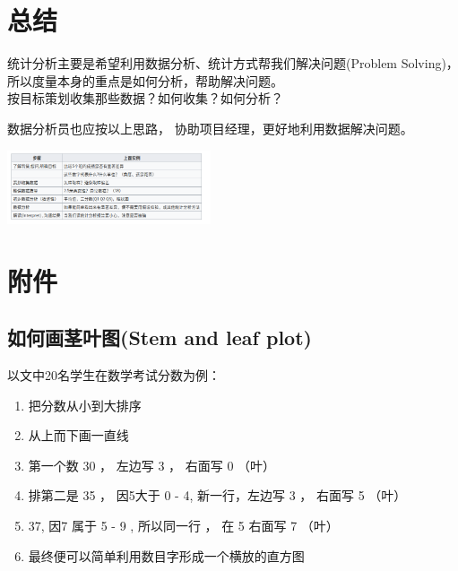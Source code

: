 \begin{description}
\item[]
\end{description}

\hypertarget{ux603bux7ed3}{%
\section{总结}\label{ux603bux7ed3}}

统计分析主要是希望利用数据分析、统计方式帮我们解决问题(Problem
Solving)，所以度量本身的重点是如何分析，帮助解决问题。\\
按目标策划收集那些数据？如何收集？如何分析？

数据分析员也应按以上思路， 协助项目经理，更好地利用数据解决问题。

\includegraphics[width=6cm]{Screenshotfrom2023-01-0222-21-59.png}

\hypertarget{ux9644ux4ef6}{%
\section{附件}\label{ux9644ux4ef6}}

\hypertarget{ux5982ux4f55ux753bux830eux53f6ux56festem-and-leaf-plot}{%
\subsection{如何画茎叶图(Stem and leaf
plot)}\label{ux5982ux4f55ux753bux830eux53f6ux56festem-and-leaf-plot}}

以文中20名学生在数学考试分数为例：

\begin{enumerate}
\tightlist
\item
  把分数从小到大排序
\item
  从上而下画一直线
\item
  第一个数 30 ， 左边写 3 ， 右面写 0 （叶）
\item
  排第二是 35 ， 因5大于 0 - 4, 新一行，左边写 3 ， 右面写 5 （叶）
\item
  37, 因7 属于 5 - 9 , 所以同一行 ， 在 5 右面写 7 （叶）
\item
  最终便可以简单利用数目字形成一个横放的直方图
\end{enumerate}

